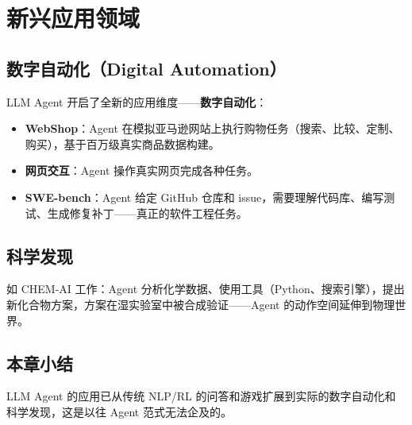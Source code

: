 \section{新兴应用领域}

\subsection{数字自动化（Digital Automation）}

LLM Agent 开启了全新的应用维度——\textbf{数字自动化}：

\begin{itemize}
    \item \textbf{WebShop}：Agent 在模拟亚马逊网站上执行购物任务（搜索、比较、定制、购买），基于百万级真实商品数据构建。
    \item \textbf{网页交互}：Agent 操作真实网页完成各种任务。
    \item \textbf{SWE-bench}：Agent 给定 GitHub 仓库和 issue，需要理解代码库、编写测试、生成修复补丁——真正的软件工程任务。
\end{itemize}

\subsection{科学发现}

如 CHEM-AI 工作：Agent 分析化学数据、使用工具（Python、搜索引擎），提出新化合物方案，方案在湿实验室中被合成验证——Agent 的动作空间延伸到物理世界。

\subsection{本章小结}

LLM Agent 的应用已从传统 NLP/RL 的问答和游戏扩展到实际的数字自动化和科学发现，这是以往 Agent 范式无法企及的。

